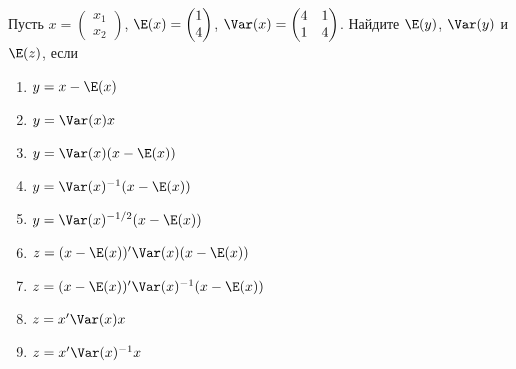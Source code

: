 \documentclass[pdftex,11pt,openany]{book}\usepackage[]{graphicx}\usepackage[]{color}
\begin{document}
\begin{solution}
\end{solution}


\begin{problem}
Пусть  $x = \begin{pmatrix} x_1 \\ x_2 \end{pmatrix}$, $\E(x) = \begin{pmatrix} 1 \\ 4 \end{pmatrix}$, $\Var(x) = \begin{pmatrix} 4 & 1 \\ 1 & 4 \end{pmatrix}$. Найдите $\E(y)$, $\Var(y)$ и $\E(z)$, если
\begin{enumerate}
\item $y = x - \E(x)$
\item $y = \Var(x)x$
\item $y = \Var(x)(x - \E(x))$
\item $y = \Var(x)^{-1}(x - \E(x))$
\item $y = \Var(x)^{-1/2}(x - \E(x))$
\item $z = (x - \E(x))'\Var(x)(x - \E(x))$
\item $z = (x - \E(x))'\Var(x)^{-1}(x - \E(x))$
\item $z = x'\Var(x)x$
\item $z = x'\Var(x)^{-1}x$
\end{enumerate}

\end{problem}

\begin{solution}
\end{solution}
\end{document}
